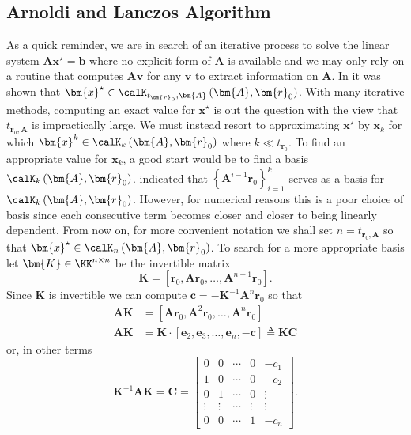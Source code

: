 \subsection{Arnoldi and Lanczos Algorithm}\label{Section4.3}

As a quick reminder, we are in search of an iterative process to solve the linear system $\bm{A} \bm{x}^{\star} = \bm{b}$ where no explicit form of $\bm{A}$ is available and we may only rely on a routine that computes $\bm{A} \bm{v}$ for any $\bm{v}$ to extract information on $\bm{A}$. In  it was shown that $\bm{x}^{\star} \in \calK_{t_{\bm{r}_0}, \bm{A}} \left( \bm{A}, \bm{r}_0 \right)$. With many iterative methods, computing an exact value for $\bm{x}^{\star}$ is out the question with the view that $t_{\bm{r}_0, \bm{A}}$ is impractically large. We must instead resort to approximating $\bm{x}^{\star}$ by $\bm{x}_k$ for which $\bm{x}^{k} \in \calK_{k} \left( \bm{A}, \bm{r}_0 \right)$ where $k \ll t_{\bm{r}_0}$. To find an appropriate value for $\bm{x}_k$, a good start would be to find a basis $\calK_{k} \left( \bm{A}, \bm{r}_0 \right)$.  indicated that $\left\{ \bm{A}^{i-1} \bm{r}_0 \right\}_{i=1}^{k}$ serves as a basis for $\calK_{k} \left( \bm{A}, \bm{r}_0 \right)$. However, for numerical reasons this is a poor choice of basis since each consecutive term becomes closer and closer to being linearly dependent. From now on, for more convenient notation we shall set $n = t_{\bm{r}_0, \bm{A}}$ so that $\bm{x}^{\star} \in \calK_{n} \left( \bm{A}, \bm{r}_0 \right)$. To search for a more appropriate basis let $\bm{K} \in \KK^{n \times n}$ be the invertible matrix
\[
    \bm{K} = \left[ \bm{r}_0 , \bm{A} \bm{r}_0, \ldots , \bm{A}^{n-1} \bm{r}_0 \right].
\]
Since $\bm{K}$ is invertible we can compute $\bm{c} = - \bm{K}^{-1} \bm{A}^{n} \bm{r}_0$ so that
\begin{align*}
    \bm{A} \bm{K} & = \left[ \bm{A} \bm{r}_0, \bm{A}^{2} \bm{r}_0, \ldots , \bm{A}^{n} \bm{r}_0 \right]                     \\
    \bm{A} \bm{K} & = \bm{K} \cdot \left[ \bm{e}_2, \bm{e}_3, \ldots , \bm{e}_n, - \bm{c}  \right] \triangleq \bm{K} \bm{C}
\end{align*}
or, in other terms
\[
    \bm{K}^{-1} \bm{A} \bm{K} = \bm{C} =
    \begin{bmatrix}
        0      & 0      & \cdots & 0      & -c_1   \\
        1      & 0      & \cdots & 0      & -c_2   \\
        0      & 1      & \cdots & 0      & \vdots \\
        \vdots & \vdots & \cdots & \vdots & \vdots \\
        0      & 0      & \cdots & 1      & -c_n
    \end{bmatrix}.
\]
